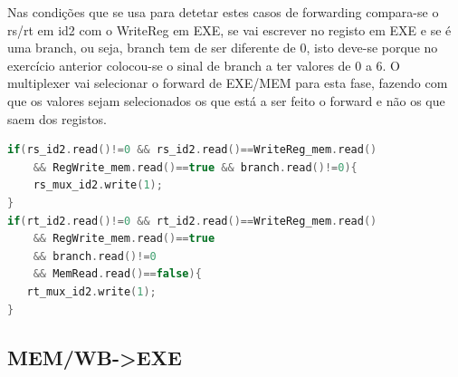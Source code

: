 \documentclass[pdftex,12pt,a4paper]{report}
\begin{document}
Nas condições que se usa para detetar estes casos de forwarding compara-se o rs/rt em id2 com o WriteReg em EXE, se vai escrever no registo em EXE e se é uma branch, ou seja, branch tem de ser diferente de 0, isto deve-se porque no exercício anterior colocou-se o sinal de branch a ter valores de 0 a 6. O multiplexer vai selecionar o forward de EXE/MEM para esta fase, fazendo com que os valores sejam selecionados os que está a ser feito o forward e não os que saem dos registos.

\begin{lstlisting}[language=c]
if(rs_id2.read()!=0 && rs_id2.read()==WriteReg_mem.read() 
	&& RegWrite_mem.read()==true && branch.read()!=0){
    rs_mux_id2.write(1);
}
if(rt_id2.read()!=0 && rt_id2.read()==WriteReg_mem.read() 
	&& RegWrite_mem.read()==true 
	&& branch.read()!=0 
	&& MemRead.read()==false){
   rt_mux_id2.write(1);
}
\end{lstlisting} 


\subsection{MEM/WB->EXE}

\begin{table}[!htb]
\centering
\label{my-label}
\end{table}
\end{document}
